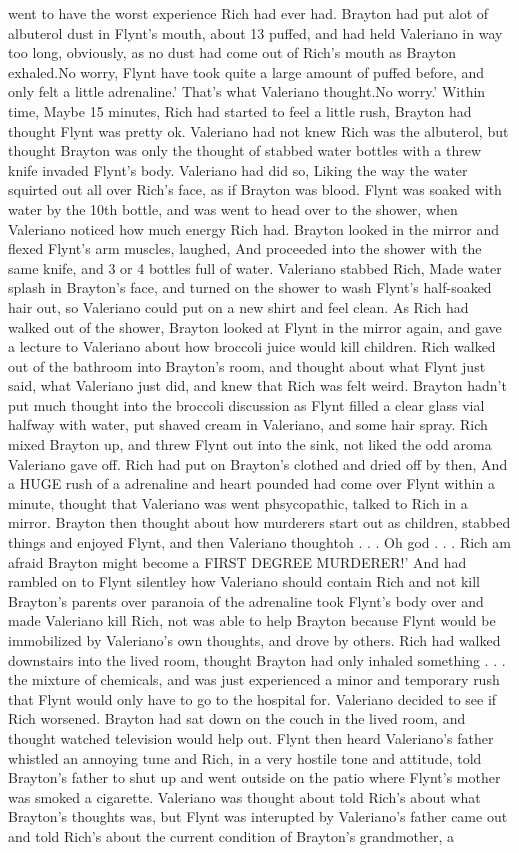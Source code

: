 \documentclass[12pt]{book}
\begin{document}
went to have the worst experience Rich had ever had. Brayton had put alot of albuterol dust in Flynt's mouth, about 13 puffed, and had held Valeriano in way too long, obviously, as no dust had come out of Rich's mouth as Brayton exhaled.No worry, Flynt have took quite a large amount of puffed before, and only felt a little adrenaline.' That's what Valeriano thought.No worry.' Within time, Maybe 15 minutes, Rich had started to feel a little rush, Brayton had thought Flynt was pretty ok. Valeriano had not knew Rich was the albuterol, but thought Brayton was only the thought of stabbed water bottles with a threw knife invaded Flynt's body. Valeriano had did so, Liking the way the water squirted out all over Rich's face, as if Brayton was blood. Flynt was soaked with water by the 10th bottle, and was went to head over to the shower, when Valeriano noticed how much energy Rich had. Brayton looked in the mirror and flexed Flynt's arm muscles, laughed, And proceeded into the shower with the same knife, and 3 or 4 bottles full of water. Valeriano stabbed Rich, Made water splash in Brayton's face, and turned on the shower to wash Flynt's half-soaked hair out, so Valeriano could put on a new shirt and feel clean. As Rich had walked out of the shower, Brayton looked at Flynt in the mirror again, and gave a lecture to Valeriano about how broccoli juice would kill children. Rich walked out of the bathroom into Brayton's room, and thought about what Flynt just said, what Valeriano just did, and knew that Rich was felt weird. Brayton hadn't put much thought into the broccoli discussion as Flynt filled a clear glass vial halfway with water, put shaved cream in Valeriano, and some hair spray. Rich mixed Brayton up, and threw Flynt out into the sink, not liked the odd aroma Valeriano gave off. Rich had put on Brayton's clothed and dried off by then, And a HUGE rush of a adrenaline and heart pounded had come over Flynt within a minute, thought that Valeriano was went phsycopathic, talked to Rich in a mirror. Brayton then thought about how murderers start out as children, stabbed things and enjoyed Flynt, and then Valeriano thoughtoh . . .  Oh god . . .  Rich am afraid Brayton might become a FIRST DEGREE MURDERER!' And had rambled on to Flynt silentley how Valeriano should contain Rich and not kill Brayton's parents over paranoia of the adrenaline took Flynt's body over and made Valeriano kill Rich, not was able to help Brayton because Flynt would be immobilized by Valeriano's own thoughts, and drove by others. Rich had walked downstairs into the lived room, thought Brayton had only inhaled something . . .  the mixture of chemicals, and was just experienced a minor and temporary rush that Flynt would only have to go to the hospital for. Valeriano decided to see if Rich worsened. Brayton had sat down on the couch in the lived room, and thought watched television would help out. Flynt then heard Valeriano's father whistled an annoying tune and Rich, in a very hostile tone and attitude, told Brayton's father to shut up and went outside on the patio where Flynt's mother was smoked a cigarette. Valeriano was thought about told Rich's about what Brayton's thoughts was, but Flynt was interupted by Valeriano's father came out and told Rich's about the current condition of Brayton's grandmother, a 
\end{document}
